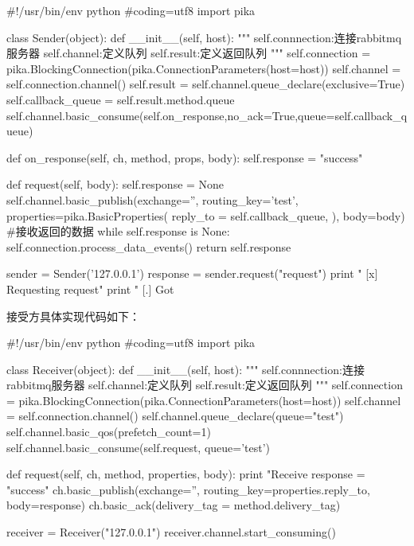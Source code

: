 \begin{python} 
#!/usr/bin/env python
#coding=utf8
import pika
 
class Sender(object):
    def __init__(self, host):
        """
        self.connnection:连接rabbitmq服务器
        self.channel:定义队列
        self.result:定义返回队列
        """
        self.connection = pika.BlockingConnection(pika.ConnectionParameters(host=host))
        self.channel = self.connection.channel()
        self.result = self.channel.queue_declare(exclusive=True)
        self.callback_queue = self.result.method.queue
        self.channel.basic_consume(self.on_response,no_ack=True,queue=self.callback_queue)
 
    def on_response(self, ch, method, props, body):
        self.response = "success"

    def request(self, body):
        self.response = None
        self.channel.basic_publish(exchange='',
                                   routing_key='test',
                                   properties=pika.BasicProperties(
                                         reply_to = self.callback_queue,
                                         ),
                                   body=body)
        #接收返回的数据
        while self.response is None:
            self.connection.process_data_events()
        return self.response
 
sender = Sender('127.0.0.1')
response = sender.request("request")
print " [x] Requesting request"
print " [.] Got %

\end{python}  

接受方具体实现代码如下：

\begin{python} 
#!/usr/bin/env python
#coding=utf8
import pika

class Receiver(object):
  def __init__(self, host):
    """
    self.connnection:连接rabbitmq服务器
    self.channel:定义队列
    self.result:定义返回队列
    """
    self.connection =  pika.BlockingConnection(pika.ConnectionParameters(host=host))
    self.channel = self.connection.channel()
    self.channel.queue_declare(queue="test")
    self.channel.basic_qos(prefetch_count=1)
    self.channel.basic_consume(self.request, queue='test')

  def request(self, ch, method, properties, body):
    print "Receive %
    response = "success"
    ch.basic_publish(exchange='',
            routing_key=properties.reply_to,
                      body=response)
    ch.basic_ack(delivery_tag = method.delivery_tag)

receiver = Receiver("127.0.0.1")
receiver.channel.start_consuming()
\end{python}  

